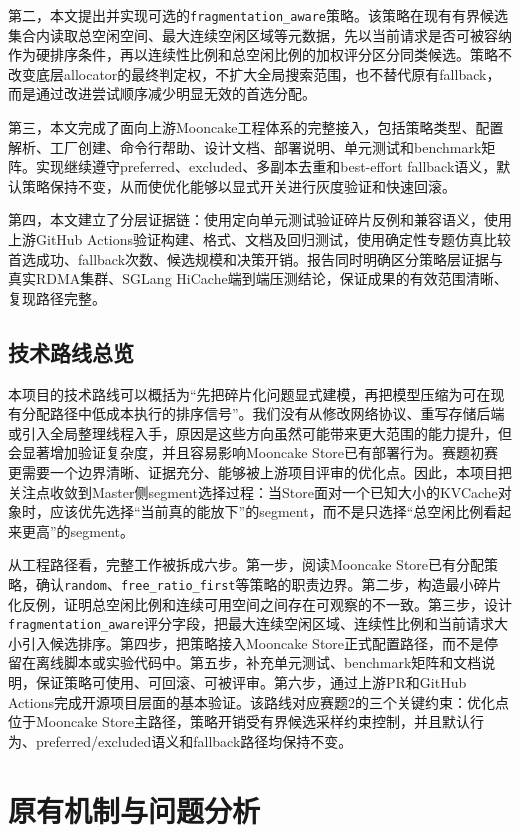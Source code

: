 \documentclass[UTF8,zihao=-4,a4paper]{ctexart}
\newcommand{\artifact}[1]{\texttt{#1}}
\newcommand{\strategy}{\texttt{fragmentation\_aware}}
\newcommand{\baseline}{\texttt{free\_ratio\_first}}
\begin{document}
第二，本文提出并实现可选的\strategy{}策略。该策略在现有有界候选集合内读取总空闲空间、最大连续空闲区域等元数据，先以当前请求是否可被容纳作为硬排序条件，再以连续性比例和总空闲比例的加权评分区分同类候选。策略不改变底层allocator的最终判定权，不扩大全局搜索范围，也不替代原有fallback，而是通过改进尝试顺序减少明显无效的首选分配。

第三，本文完成了面向上游Mooncake工程体系的完整接入，包括策略类型、配置解析、工厂创建、命令行帮助、设计文档、部署说明、单元测试和benchmark矩阵。实现继续遵守preferred、excluded、多副本去重和best-effort fallback语义，默认策略保持不变，从而使优化能够以显式开关进行灰度验证和快速回滚。

第四，本文建立了分层证据链：使用定向单元测试验证碎片反例和兼容语义，使用上游GitHub Actions验证构建、格式、文档及回归测试，使用确定性专题仿真比较首选成功、fallback次数、候选规模和决策开销。报告同时明确区分策略层证据与真实RDMA集群、SGLang HiCache端到端压测结论，保证成果的有效范围清晰、复现路径完整。

\subsection{技术路线总览}

本项目的技术路线可以概括为“先把碎片化问题显式建模，再把模型压缩为可在现有分配路径中低成本执行的排序信号”。我们没有从修改网络协议、重写存储后端或引入全局整理线程入手，原因是这些方向虽然可能带来更大范围的能力提升，但会显著增加验证复杂度，并且容易影响Mooncake Store已有部署行为。赛题初赛更需要一个边界清晰、证据充分、能够被上游项目评审的优化点。因此，本项目把关注点收敛到Master侧segment选择过程：当Store面对一个已知大小的KVCache对象时，应该优先选择“当前真的能放下”的segment，而不是只选择“总空闲比例看起来更高”的segment。

从工程路径看，完整工作被拆成六步。第一步，阅读Mooncake Store已有分配策略，确认\artifact{random}、\baseline{}等策略的职责边界。第二步，构造最小碎片化反例，证明总空闲比例和连续可用空间之间存在可观察的不一致。第三步，设计\strategy{}评分字段，把最大连续空闲区域、连续性比例和当前请求大小引入候选排序。第四步，把策略接入Mooncake Store正式配置路径，而不是停留在离线脚本或实验代码中。第五步，补充单元测试、benchmark矩阵和文档说明，保证策略可使用、可回滚、可被评审。第六步，通过上游PR和GitHub Actions完成开源项目层面的基本验证。该路线对应赛题2的三个关键约束：优化点位于Mooncake Store主路径，策略开销受有界候选采样约束控制，并且默认行为、preferred/excluded语义和fallback路径均保持不变。

\section{原有机制与问题分析}
\end{document}
